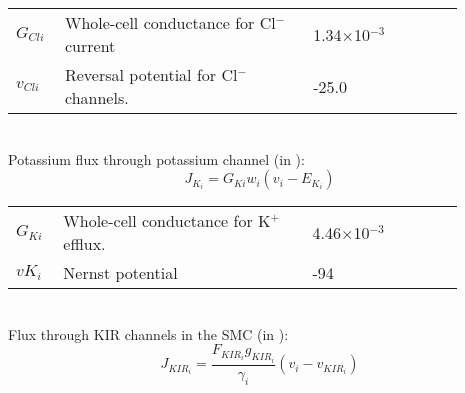 \documentclass[fleqn]{report}
\numberwithin{equation}{section}
\numberwithin{equation}{section}
\begin{document}
	\begin{table}[h!]
	\centering
	\begin{tabular}{ p{0.09\linewidth}  >{\footnotesize} p{0.5\linewidth}  >{\footnotesize} p{0.27\linewidth} >{\footnotesize} p{0.03\linewidth} }
	\hline
	$G_{Cli}$      			& Whole-cell conductance for Cl$^{-}$ current		& 1.34$\times$10$^{-3}$ \uMpmVs	&\cite{Koenigsberger2006} \\
	$v_{Cli}$      			& Reversal potential for Cl$^{-}$ channels.			& -25.0 \mV			&\cite{Koenigsberger2006} \\
	\hline
	\end{tabular}
	\label{tab:JCli}
	\end{table}
	\\
	Potassium flux through potassium channel (in \uMs):
	\begin{equation} \label{eq:JKi}
	J_{K_{i}}= G_{Ki} w_{i} \left(  v_{i} - E_{K_{i} } \right) 
	\end{equation}
	\begin{table}[h!]
	\centering
	\begin{tabular}{ p{0.09\linewidth}  >{\footnotesize} p{0.5\linewidth}  >{\footnotesize} p{0.27\linewidth} >{\footnotesize} p{0.03\linewidth} }
	\hline
	$G_{Ki}$      			& Whole-cell conductance for K$^{+}$ efflux.			& 4.46$\times$10$^{-3}$ \uMpmVs	&\cite{Koenigsberger2006} \\
	$vK_i$      			& Nernst potential										& -94 \mV	&\cite{Koenigsberger2006} \\
	\hline
	\end{tabular}
	\label{tab:JKi}
	\end{table}
	\\
	Flux through KIR channels in the SMC (in \uMs): 
	\begin{equation} \label{eq:JKIRi}
	J_{KIR_{i}} =  \frac{F_{KIR_{i}} g_{KIR_{i}}}{\gamma_{i}}( v_{i} - v_{KIR_{i}})
	\end{equation}
\end{document}

